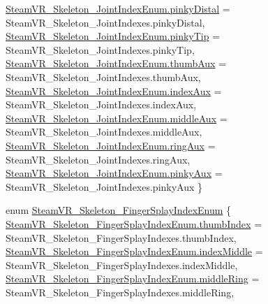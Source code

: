 \begin{DoxyCompactItemize}
\mbox{\hyperlink{namespace_valve_1_1_v_r_a99f7cc968994699a7485078bafddac17a84c06787f78d70676163f2c1c9738898}{Steam\+V\+R\+\_\+\+Skeleton\+\_\+\+Joint\+Index\+Enum.\+pinky\+Distal}} = Steam\+V\+R\+\_\+\+Skeleton\+\_\+\+Joint\+Indexes.\+pinky\+Distal, 
\mbox{\hyperlink{namespace_valve_1_1_v_r_a99f7cc968994699a7485078bafddac17a1caa6d70faf503d7a147e5aef99f8eef}{Steam\+V\+R\+\_\+\+Skeleton\+\_\+\+Joint\+Index\+Enum.\+pinky\+Tip}} = Steam\+V\+R\+\_\+\+Skeleton\+\_\+\+Joint\+Indexes.\+pinky\+Tip, 
\mbox{\hyperlink{namespace_valve_1_1_v_r_a99f7cc968994699a7485078bafddac17af6d9095dc001dce7462f49ed5dc10b0b}{Steam\+V\+R\+\_\+\+Skeleton\+\_\+\+Joint\+Index\+Enum.\+thumb\+Aux}} = Steam\+V\+R\+\_\+\+Skeleton\+\_\+\+Joint\+Indexes.\+thumb\+Aux, 
\newline
\mbox{\hyperlink{namespace_valve_1_1_v_r_a99f7cc968994699a7485078bafddac17af29cc6ae72d34a404b410e8891c7d32a}{Steam\+V\+R\+\_\+\+Skeleton\+\_\+\+Joint\+Index\+Enum.\+index\+Aux}} = Steam\+V\+R\+\_\+\+Skeleton\+\_\+\+Joint\+Indexes.\+index\+Aux, 
\mbox{\hyperlink{namespace_valve_1_1_v_r_a99f7cc968994699a7485078bafddac17adbe9d8162b08abbf02d8853149f0b08e}{Steam\+V\+R\+\_\+\+Skeleton\+\_\+\+Joint\+Index\+Enum.\+middle\+Aux}} = Steam\+V\+R\+\_\+\+Skeleton\+\_\+\+Joint\+Indexes.\+middle\+Aux, 
\mbox{\hyperlink{namespace_valve_1_1_v_r_a99f7cc968994699a7485078bafddac17a72297048795f3aeab7d9045a01c0fc8c}{Steam\+V\+R\+\_\+\+Skeleton\+\_\+\+Joint\+Index\+Enum.\+ring\+Aux}} = Steam\+V\+R\+\_\+\+Skeleton\+\_\+\+Joint\+Indexes.\+ring\+Aux, 
\mbox{\hyperlink{namespace_valve_1_1_v_r_a99f7cc968994699a7485078bafddac17a072d9f38166b1a74105e742e6cb2e2bc}{Steam\+V\+R\+\_\+\+Skeleton\+\_\+\+Joint\+Index\+Enum.\+pinky\+Aux}} = Steam\+V\+R\+\_\+\+Skeleton\+\_\+\+Joint\+Indexes.\+pinky\+Aux
 \}
\item 
enum \mbox{\hyperlink{namespace_valve_1_1_v_r_a43c97e13fe46f0575986b9f74945e0bf}{Steam\+V\+R\+\_\+\+Skeleton\+\_\+\+Finger\+Splay\+Index\+Enum}} \{ \mbox{\hyperlink{namespace_valve_1_1_v_r_a43c97e13fe46f0575986b9f74945e0bfa0e68921a6dfcc5d65d5b92100b8bfcc9}{Steam\+V\+R\+\_\+\+Skeleton\+\_\+\+Finger\+Splay\+Index\+Enum.\+thumb\+Index}} = Steam\+V\+R\+\_\+\+Skeleton\+\_\+\+Finger\+Splay\+Indexes.\+thumb\+Index, 
\mbox{\hyperlink{namespace_valve_1_1_v_r_a43c97e13fe46f0575986b9f74945e0bfa33da99a31b919de6191bc93fc628c1f0}{Steam\+V\+R\+\_\+\+Skeleton\+\_\+\+Finger\+Splay\+Index\+Enum.\+index\+Middle}} = Steam\+V\+R\+\_\+\+Skeleton\+\_\+\+Finger\+Splay\+Indexes.\+index\+Middle, 
\mbox{\hyperlink{namespace_valve_1_1_v_r_a43c97e13fe46f0575986b9f74945e0bfa955e36276d669951742ab559c1d1edd1}{Steam\+V\+R\+\_\+\+Skeleton\+\_\+\+Finger\+Splay\+Index\+Enum.\+middle\+Ring}} = Steam\+V\+R\+\_\+\+Skeleton\+\_\+\+Finger\+Splay\+Indexes.\+middle\+Ring, 

\end{DoxyCompactItemize}
